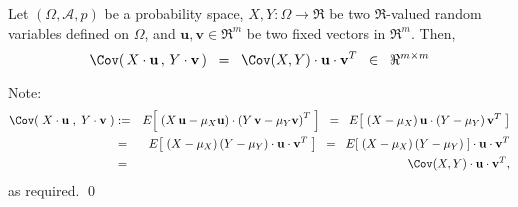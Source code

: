 \begin{lemma}
\label{lemma:technical}
\mbox{}
\vskip 0.1cm
\noindent
Let $(\Omega,\mathcal{A},p)$ be a probability space,
$X, Y : \Omega \longrightarrow \Re$ be two $\Re$-valued random variables defined on $\Omega$,
and $\mathbf{u}, \mathbf{v} \in \Re^{m}$ be two fixed vectors in $\Re^{m}$.
Then,
\begin{equation*}
\Cov\!\left(\,X\cdot\mathbf{u}\,,\,Y\cdot\mathbf{v}\,\right)
\;\;=\;\;
\Cov(X,Y)\cdot\mathbf{u}\cdot\mathbf{v}^{T}
\;\;\in\;\; \Re^{m \times m}
\end{equation*}
\end{lemma}

\proof
Note:
\begin{eqnarray*}
\Cov\!\left(\;X\cdot\mathbf{u}\;,\;Y\cdot\mathbf{v}\;\right)
&:=& E\!\left[\;\left(X\,\mathbf{u} - \mu_{X}\mathbf{u}\right)\cdot\left(Y\,\mathbf{v} - \mu_{Y}\mathbf{v}\right)^{T}\;\right]
\;\;=\;\; E\!\left[\;\left(X - \mu_{X}\right)\mathbf{u}\cdot\left(Y - \mu_{Y}\right)\mathbf{v}^{T}\;\right] \\
&=& E\!\left[\;\left(X - \mu_{X}\right)\left(Y - \mu_{Y}\right)\cdot\mathbf{u}\cdot\mathbf{v}^{T}\;\right] 
\;\;=\;\; E\!\left[\;\left(X - \mu_{X}\right)\left(Y - \mu_{Y}\right)\;\right]\cdot\mathbf{u}\cdot\mathbf{v}^{T} \\
&=& \Cov(X,Y)\cdot\mathbf{u}\cdot\mathbf{v}^{T},
\end{eqnarray*}
as required.
\qed

